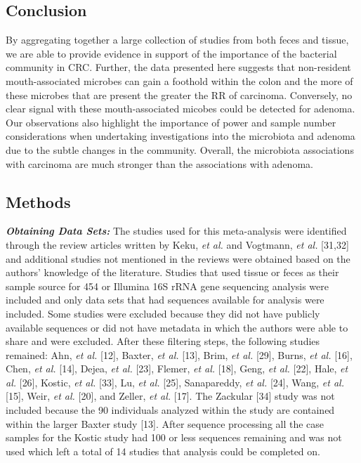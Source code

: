 \documentclass[12pt,]{article}
\begin{document}
\newpage

\subsection{Conclusion}\label{conclusion}

By aggregating together a large collection of studies from both feces
and tissue, we are able to provide evidence in support of the importance
of the bacterial community in CRC. Further, the data presented here
suggests that non-resident mouth-associated microbes can gain a foothold
within the colon and the more of these microbes that are present the
greater the RR of carcinoma. Conversely, no clear signal with these
mouth-associated micobes could be detected for adenoma. Our observations
also highlight the importance of power and sample number considerations
when undertaking investigations into the microbiota and adenoma due to
the subtle changes in the community. Overall, the microbiota
associations with carcinoma are much stronger than the associations with
adenoma.

\newpage

\subsection{Methods}\label{methods}

\textbf{\emph{Obtaining Data Sets:}} The studies used for this
meta-analysis were identified through the review articles written by
Keku, \emph{et al.} and Vogtmann, \emph{et al.} {[}31,32{]} and
additional studies not mentioned in the reviews were obtained based on
the authors' knowledge of the literature. Studies that used tissue or
feces as their sample source for 454 or Illumina 16S rRNA gene
sequencing analysis were included and only data sets that had sequences
available for analysis were included. Some studies were excluded because
they did not have publicly available sequences or did not have metadata
in which the authors were able to share and were excluded. After these
filtering steps, the following studies remained: Ahn, \emph{et al.}
{[}12{]}, Baxter, \emph{et al.} {[}13{]}, Brim, \emph{et al.} {[}29{]},
Burns, \emph{et al.} {[}16{]}, Chen, \emph{et al.} {[}14{]}, Dejea,
\emph{et al.} {[}23{]}, Flemer, \emph{et al.} {[}18{]}, Geng, \emph{et
al.} {[}22{]}, Hale, \emph{et al.} {[}26{]}, Kostic, \emph{et al.}
{[}33{]}, Lu, \emph{et al.} {[}25{]}, Sanapareddy, \emph{et al.}
{[}24{]}, Wang, \emph{et al.} {[}15{]}, Weir, \emph{et al.} {[}20{]},
and Zeller, \emph{et al.} {[}17{]}. The Zackular {[}34{]} study was not
included because the 90 individuals analyzed within the study are
contained within the larger Baxter study {[}13{]}. After sequence
processing all the case samples for the Kostic study had 100 or less
sequences remaining and was not used which left a total of 14 studies
that analysis could be completed on.
\end{document}
